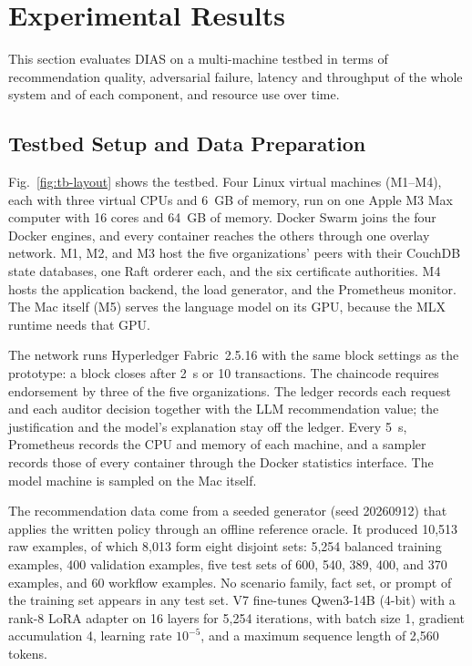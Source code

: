 \section{Experimental Results}

This section evaluates DIAS on a multi-machine testbed in terms of recommendation quality, adversarial failure, latency and throughput of the whole system and of each component, and resource use over time.

\subsection{Testbed Setup and Data Preparation}

Fig.~\ref{fig:tb-layout} shows the testbed. Four Linux virtual machines (M1--M4), each with three virtual CPUs and 6~GB of memory, run on one Apple M3 Max computer with 16 cores and 64~GB of memory. Docker Swarm joins the four Docker engines, and every container reaches the others through one overlay network. M1, M2, and M3 host the five organizations' peers with their CouchDB state databases, one Raft orderer each, and the six certificate authorities. M4 hosts the application backend, the load generator, and the Prometheus monitor. The Mac itself (M5) serves the language model on its GPU, because the MLX runtime needs that GPU.

The network runs Hyperledger Fabric~2.5.16 with the same block settings as the prototype: a block closes after 2~s or 10 transactions. The chaincode requires endorsement by three of the five organizations. The ledger records each request and each auditor decision together with the LLM recommendation value; the justification and the model's explanation stay off the ledger. Every 5~s, Prometheus records the CPU and memory of each machine, and a sampler records those of every container through the Docker statistics interface. The model machine is sampled on the Mac itself.

The recommendation data come from a seeded generator (seed 20260912) that applies the written policy through an offline reference oracle. It produced 10,513 raw examples, of which 8,013 form eight disjoint sets: 5,254 balanced training examples, 400 validation examples, five test sets of 600, 540, 389, 400, and 370 examples, and 60 workflow examples. No scenario family, fact set, or prompt of the training set appears in any test set. V7 fine-tunes Qwen3-14B (4-bit) with a rank-8 LoRA adapter on 16 layers for 5,254 iterations, with batch size 1, gradient accumulation 4, learning rate $10^{-5}$, and a maximum sequence length of 2,560 tokens.

